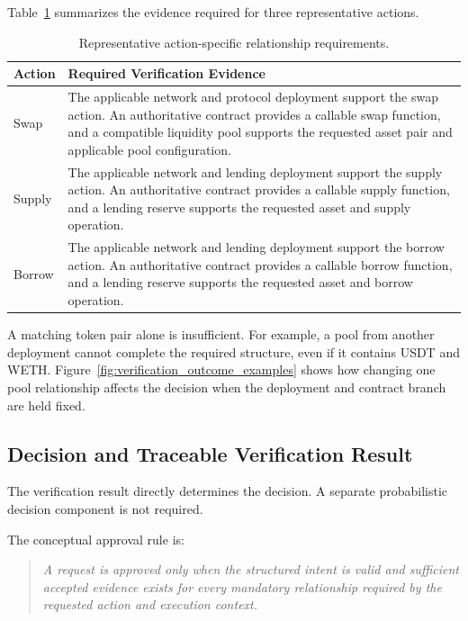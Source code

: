 Table~\ref{tab:verification_patterns} summarizes the evidence required for
three representative actions.

\begin{table}[H]
\centering
\caption{Representative action-specific relationship requirements.}
\label{tab:verification_patterns}

\small

\begin{tabular}{p{} p{}}
\hline
\textbf{Action} & \textbf{Required Verification Evidence} \\
\hline

Swap &
The applicable network and protocol deployment support the swap action.
An authoritative contract provides a callable swap function, and a
compatible liquidity pool supports the requested asset pair and
applicable pool configuration. \\

Supply &
The applicable network and lending deployment support the supply action.
An authoritative contract provides a callable supply function, and a
lending reserve supports the requested asset and supply operation. \\

Borrow &
The applicable network and lending deployment support the borrow action.
An authoritative contract provides a callable borrow function, and a
lending reserve supports the requested asset and borrow operation. \\

\hline
\end{tabular}
\end{table}

A matching token pair alone is insufficient. For example, a pool from
another deployment cannot complete the required structure, even if it
contains USDT and WETH. Figure~\ref{fig:verification_outcome_examples}
shows how changing one pool relationship affects the decision when the
deployment and contract branch are held fixed.

\subsection{Decision and Traceable Verification Result}

The verification result directly determines the decision. A separate
probabilistic decision component is not required.

The conceptual approval rule is:

\begin{quote}
\textit{A request is approved only when the structured intent is valid and
sufficient accepted evidence exists for every mandatory relationship required
by the requested action and execution context.}
\end{quote}

